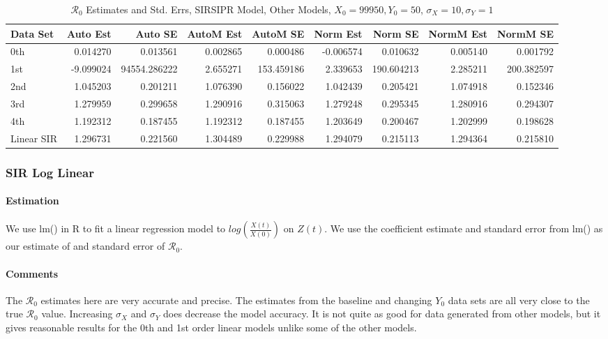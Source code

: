 \documentclass[12pt]{article}
\newcommand{\rr}{\ensuremath{\mathcal{R}_0}}
\begin{document}
\begin{table}[H]
	
	\caption{$\rr$ Estimates and Std. Errs, SIRSIPR Model,
		Other Models, $X_0 = 99950, Y_0 = 50$, 
		$\sigma_X = 10, \sigma_Y = 1$}
	\begin{footnotesize}
		\hskip -1cm
		\begin{tabular}{l|r|r|r|r|r|r|r|r}
			\hline
			Data Set & Auto Est & Auto SE & AutoM Est & AutoM SE & Norm Est & Norm SE & NormM Est & NormM SE\\
			\hline
			0th & 0.014270 & 0.013561 & 0.002865 & 0.000486 & -0.006574 & 0.010632 & 0.005140 & 0.001792\\
			\hline
			1st & -9.099024 & 94554.286222 & 2.655271 & 153.459186 & 2.339653 & 190.604213 & 2.285211 & 200.382597\\
			\hline
			2nd & 1.045203 & 0.201211 & 1.076390 & 0.156022 & 1.042439 & 0.205421 & 1.074918 & 0.152346\\
			\hline
			3rd & 1.279959 & 0.299658 & 1.290916 & 0.315063 & 1.279248 & 0.295345 & 1.280916 & 0.294307\\
			\hline
			4th & 1.192312 & 0.187455 & 1.192312 & 0.187455 & 1.203649 & 0.200467 & 1.202999 & 0.198628\\
			\hline
			Linear SIR & 1.296731 & 0.221560 & 1.304489 & 0.229988 & 1.294079 & 0.215113 & 1.294364 & 0.215810\\
			\hline
		\end{tabular}
	\end{footnotesize}
\end{table}

\subsubsection{SIR Log Linear}

\paragraph{Estimation}

We use lm() in R to fit a linear regression model to $log(\frac{X(t)}{X(0)})$ on $Z(t)$. We use the coefficient estimate and standard error from lm() as our estimate of and standard error of $\rr$.

\paragraph{Comments}

The $\rr$ estimates here are very accurate and precise. The estimates from the baseline and changing $Y_0$ data sets are all very close to the true $\rr$ value. Increasing $\sigma_X$ and $\sigma_Y$ does decrease the model accuracy. It is not quite as good for data generated from other models, but it gives reasonable results for the 0th and 1st order linear models unlike some of the other models.
\end{document}
